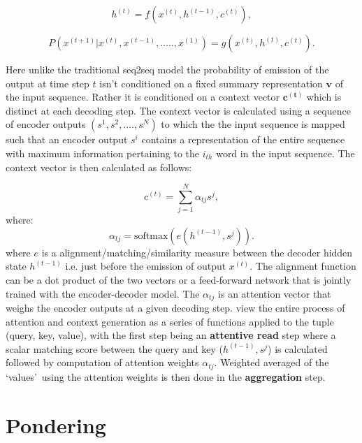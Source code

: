 \begin{equation}\label{attn:eqn1}
h^{(t)} = f(x^{(t)}, h^{(t-1)}, c^{(t)}),
\end{equation}

\begin{equation} \label{attn:eqn2}
P(x^{(t+1)}|x^{(t)}, x^{(t-1)},.....,x^{(1)}) = g(x^{(t)}, h^{(t)}, c^{(t)}).
\end{equation}

Here unlike the traditional seq2seq model the probability of emission of the output at time step $t$ isn't conditioned on a fixed summary representation $\mathbf{v}$ of the input sequence. Rather it is conditioned on a context vector $\mathbf{c^{(t)}}$ which is distinct at each decoding step. The context vector is calculated using a sequence of encoder outputs $(s^1, s^2, ....,s^N)$ to which the the input sequence is mapped such that an encoder output $s^i$ contains a representation of the entire sequence with maximum information pertaining to the $i_{th}$ word in the input sequence. The context vector is then calculated as follows:

\begin{equation}\label{attn:eqn3}
c^{(t)}  = \sum_{j=1}^N \alpha_{tj} s^j,
\end{equation}
where:
\begin{equation}\label{attn:eqn4}
\alpha_{tj} = \text{softmax}(e(h^{(t-1)}, s^j)).
\end{equation}
where $e$ is a alignment/matching/similarity measure between the decoder hidden state $h^{(t-1)}$ i.e. just before the emission of output $x^{(t)}$. The alignment function can be a dot product of the two vectors or a feed-forward network that is jointly trained with the encoder-decoder model. The $\alpha_{tj}$ is an attention vector that weighs the encoder outputs at a given decoding step. \cite{Vaswani2017} view the entire process of attention and context generation as a series of functions applied to the tuple (query, key, value), with the first step being an \textbf{attentive read} step where a scalar matching score between the query and key ($h^{(t-1)}, s^j$) is calculated followed by computation of attention weights $\alpha_{tj}$. Weighted averaged of the \lq values{}\rq\ using the attention weights is then done in the \textbf{aggregation} step.  


\section{Pondering}\label{bck:ponder}

